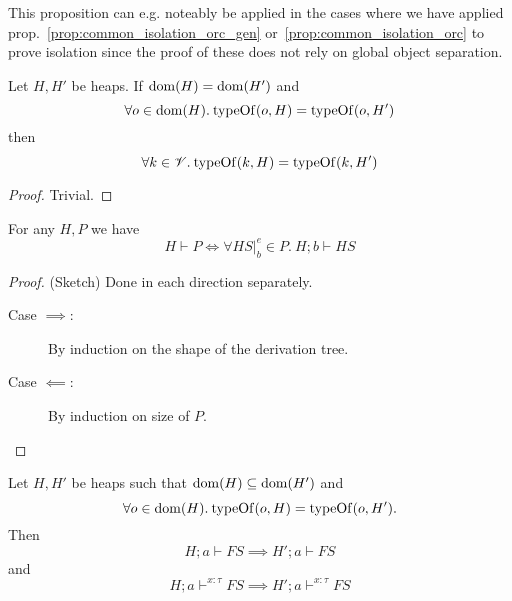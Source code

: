 \begin{remark}
  This proposition can e.g. noteably be applied in the cases where we have
  applied prop.~\ref{prop:common_isolation_orc_gen}
  or~\ref{prop:common_isolation_orc} to prove isolation since the proof of
  these does not rely on global object separation.
\end{remark}

\begin{proposition}
  Let $H, H'$ be heaps. If $\mbox{$\mathrm{dom}$}{(H)} = \mbox{$\mathrm{dom}$}{(H')}$ and
  \begin{equation*}
    \forall o \in \mbox{$\mathrm{dom}$}{(H)}. \: \mbox{$\mathrm{typeOf}$}{(o, H)} = \mbox{$\mathrm{typeOf}$}{(o, H')}
  \end{equation*}
  then 
  \begin{equation*}
    \forall k \in \mathscr{V}. \: \mbox{$\mathrm{typeOf}$}{(k, H)} = \mbox{$\mathrm{typeOf}$}{(k, H')}
  \end{equation*}
\end{proposition}

\begin{proof}
  Trivial.
\end{proof}

\begin{proposition} \label{prop:tprocseq}
  For any $H, P$ we have 
  \begin{equation}
    H \vdash P \iff \forall HS|_b^e \in P.\: H;b \vdash HS
  \end{equation}
\end{proposition}

\begin{proof} (Sketch) Done in each direction separately.
  \begin{description}
    \item[Case $\implies$:] By induction on the shape of the derivation tree.
    \item[Case $\impliedby$:] By induction on size of $P$.
  \end{description}
\end{proof}

\begin{proposition}
  Let $H, H'$ be heaps such that $\mbox{$\mathrm{dom}$}{(H)} \subseteq \mbox{$\mathrm{dom}$}{(H')}$ and 
  \begin{equation*}
    \forall o \in \mbox{$\mathrm{dom}$}{(H)}. \: \mbox{$\mathrm{typeOf}$}{(o, H)} = \mbox{$\mathrm{typeOf}$}{(o, H')}.
  \end{equation*}
  Then
  \begin{equation*}
    H; a \vdash FS \implies H'; a \vdash FS
  \end{equation*}
  and
  \begin{equation*}
    H; a \vdash^{x :\tau} FS \implies H'; a \vdash^{x: \tau} FS
  \end{equation*}
\end{proposition}

